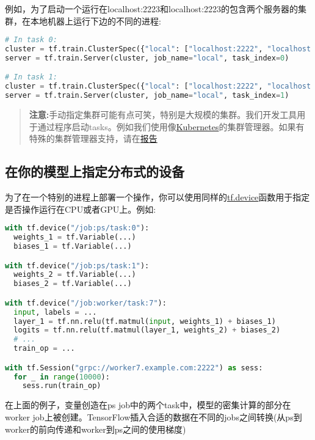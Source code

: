 例如，为了启动一个运行在localhost:2223和localhost:2223的包含两个服务器的集群，在本地机器上运行下边的不同的进程:
\begin{lstlisting}[language=Python]
# In task 0:
cluster = tf.train.ClusterSpec({"local": ["localhost:2222", "localhost:2223"]})
server = tf.train.Server(cluster, job_name="local", task_index=0)

# In task 1:
cluster = tf.train.ClusterSpec({"local": ["localhost:2222", "localhost:2223"]})
server = tf.train.Server(cluster, job_name="local", task_index=1)
\end{lstlisting}
\begin{quote}
\textbf{注意:}手动指定集群可能有点可笑，特别是大规模的集群。我们开发工具用于通过程序启动tasks。例如我们使用像\href{http://kubernetes.io/}{Kubernetes}的集群管理器。如果有特殊的集群管理器支持，请在\href{https://github.com/tensorflow/tensorflow/issues}{报告}
\end{quote}
\subsection{在你的模型上指定分布式的设备}
为了在一个特别的进程上部署一个操作，你可以使用同样的\href{https://www.tensorflow.org/api_docs/python/tf/device}{tf.device}函数用于指定是否操作运行在CPU或者GPU上。例如:
\begin{lstlisting}[language=Python]
with tf.device("/job:ps/task:0"):
  weights_1 = tf.Variable(...)
  biases_1 = tf.Variable(...)

with tf.device("/job:ps/task:1"):
  weights_2 = tf.Variable(...)
  biases_2 = tf.Variable(...)

with tf.device("/job:worker/task:7"):
  input, labels = ...
  layer_1 = tf.nn.relu(tf.matmul(input, weights_1) + biases_1)
  logits = tf.nn.relu(tf.matmul(layer_1, weights_2) + biases_2)
  # ...
  train_op = ...

with tf.Session("grpc://worker7.example.com:2222") as sess:
  for _ in range(10000):
    sess.run(train_op)
\end{lstlisting}
在上面的例子，变量创造在ps job中的两个task中，模型的密集计算的部分在worker job上被创建。TensorFlow插入合适的数据在不同的jobs之间转换(从ps到worker的前向传递和worker到ps之间的使用梯度)
